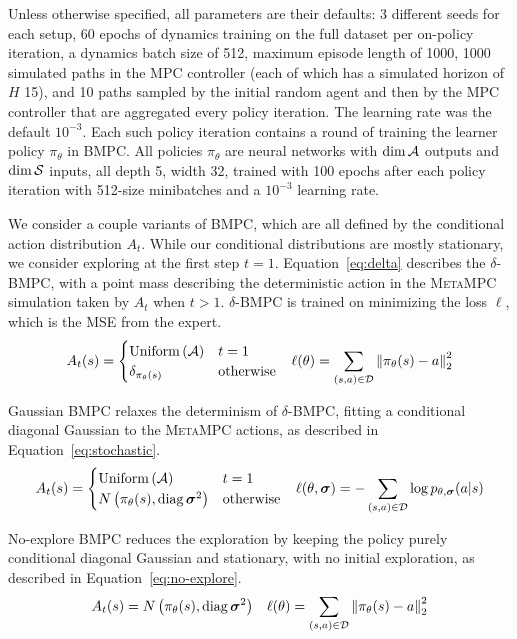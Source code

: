 \documentclass{article}
\begin{document}
Unless otherwise specified, all parameters are their defaults: 3 different seeds for each setup, 60 epochs of dynamics training on the full dataset per on-policy iteration, a dynamics batch size of 512, maximum episode length of 1000, 1000 simulated paths in the MPC controller (each of which has a simulated horizon of $H$ 15), and 10 paths sampled by the initial random agent and then by the MPC controller that are aggregated every policy iteration. The learning rate was the default $10^{-3}$. Each such policy iteration contains a round of training the learner policy $\pi_\theta$ in BMPC. All policies $\pi_\theta$ are neural networks with $\dim \mathcal{A}$ outputs and $\dim\mathcal{S}$ inputs, all depth 5, width 32, trained with 100 epochs after each policy iteration with 512-size minibatches and a $10^{-3}$ learning rate.

We consider a couple variants of BMPC, which are all defined by the conditional action distribution $A_t$. While our conditional distributions are mostly stationary, we consider exploring at the first step $t=1$. Equation~\ref{eq:delta} describes the $\delta$-BMPC, with a point mass describing the deterministic action in the \textsc{MetaMPC} simulation taken by $A_t$ when $t>1$. $\delta$-BMPC is trained on minimizing the loss $\ell$, which is the MSE from the expert.
\begin{align} \label{eq:delta}
  A_t(s)=\begin{cases}
\operatorname{Uniform}\left({\mathcal{A}}\right)    & t=1 \\
\delta_{\pi_\theta(s)} & \text{otherwise}
  \end{cases} && \ell(\theta)=\sum_{(s, a)\in\mathcal{D}}\left\lVert \pi_\theta(s)-a \right\rVert_2^2
\end{align}

Gaussian BMPC relaxes the determinism of $\delta$-BMPC, fitting a conditional diagonal Gaussian to the \textsc{MetaMPC} actions, as described in Equation~\ref{eq:stochastic}.
\begin{align} \label{eq:stochastic}
  A_t(s)=\begin{cases}
\operatorname{Uniform}\left({\mathcal{A}}\right)    & t=1 \\
N\left({\pi_\theta(s), \operatorname{diag}{\boldsymbol\sigma}^2}\right) & \text{otherwise}
  \end{cases} && \ell(\theta,{\boldsymbol\sigma})=-\sum_{(s, a)\in\mathcal{D}}\log p_{\theta,{\boldsymbol\sigma}}(a|s)
\end{align}

No-explore BMPC reduces the exploration by keeping the policy purely conditional diagonal Gaussian and stationary, with no initial exploration, as described in Equation~\ref{eq:no-explore}.
\begin{align} \label{eq:no-explore}
  A_t(s)= N\left({\pi_\theta(s), \operatorname{diag}{\boldsymbol\sigma}^2}\right) && \ell(\theta)=\sum_{(s, a)\in\mathcal{D}}\left\lVert \pi_\theta(s)-a \right\rVert_2^2
\end{align}
\end{document}
